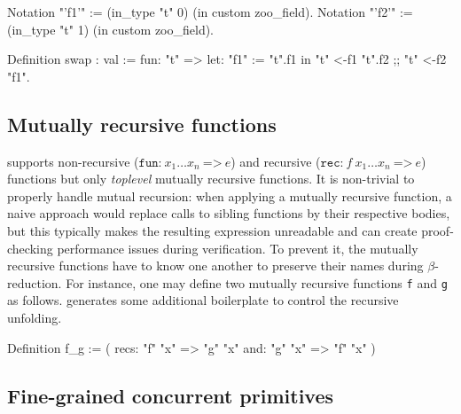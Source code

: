 \begin{coqcode}
Notation "'f1'" := (in_type "t" 0) (in custom zoo_field).
Notation "'f2'" := (in_type "t" 1) (in custom zoo_field).

Definition swap : val := fun: "t" =>
  let: "f1" := "t".{f1} in
  "t" <-{f1} "t".{f2} ;; "t" <-{f2} "f1".
\end{coqcode}

\subsection{Mutually recursive functions}

\Zoo supports non-recursive ($\texttt{fun:}\ x_1 \dots x_n\ \texttt{=>}\ e$) and recursive ($\texttt{rec:}\ f\ x_1 \dots x_n\ \texttt{=>}\ e$) functions but only \emph{toplevel} mutually recursive functions.
It is non-trivial to properly handle mutual recursion: when applying a mutually recursive function, a naive approach would replace calls to sibling functions by their respective bodies, but this typically makes the resulting expression unreadable and can create proof-checking performance issues during verification.
To prevent it, the mutually recursive functions have to know one another to preserve their names during $\beta$-reduction.
For instance, one may define two mutually recursive functions \texttt{f} and \texttt{g} as follows.
\ocamlToZoo generates some additional boilerplate to control the recursive unfolding.

\begin{coqcode}
Definition f_g := (
  recs: "f" "x" => "g" "x"
  and:  "g" "x" => "f" "x"
)%
\end{coqcode}

\subsection{Fine-grained concurrent primitives}
\label{sec:atomic}

